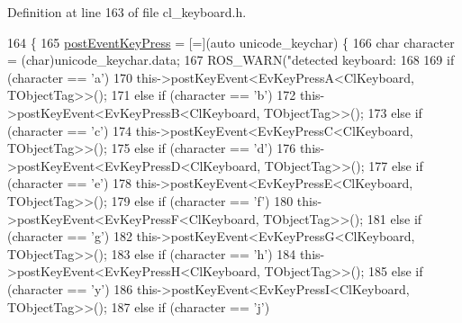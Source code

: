 Definition at line 163 of file cl\+\_\+keyboard.\+h.


\begin{DoxyCode}
164         \{
165                 \hyperlink{classkeyboard__client_1_1ClKeyboard_aadd675eea47a012b348a4e6c00e7e9d0}{postEventKeyPress} = [=](\textcolor{keyword}{auto} unicode\_keychar) \{
166                         \textcolor{keywordtype}{char} character = (char)unicode\_keychar.data;
167                         ROS\_WARN(\textcolor{stringliteral}{"detected keyboard: %
168 
169                         \textcolor{keywordflow}{if} (character == \textcolor{charliteral}{'a'})
170                                 this->postKeyEvent<EvKeyPressA<ClKeyboard, TObjectTag>>();
171                         \textcolor{keywordflow}{else} \textcolor{keywordflow}{if} (character == \textcolor{charliteral}{'b'})
172                                 this->postKeyEvent<EvKeyPressB<ClKeyboard, TObjectTag>>();
173                         \textcolor{keywordflow}{else} \textcolor{keywordflow}{if} (character == \textcolor{charliteral}{'c'})
174                                 this->postKeyEvent<EvKeyPressC<ClKeyboard, TObjectTag>>();
175                         \textcolor{keywordflow}{else} \textcolor{keywordflow}{if} (character == \textcolor{charliteral}{'d'})
176                                 this->postKeyEvent<EvKeyPressD<ClKeyboard, TObjectTag>>();
177                         \textcolor{keywordflow}{else} \textcolor{keywordflow}{if} (character == \textcolor{charliteral}{'e'})
178                                 this->postKeyEvent<EvKeyPressE<ClKeyboard, TObjectTag>>();
179                         \textcolor{keywordflow}{else} \textcolor{keywordflow}{if} (character == \textcolor{charliteral}{'f'})
180                                 this->postKeyEvent<EvKeyPressF<ClKeyboard, TObjectTag>>();
181                         \textcolor{keywordflow}{else} \textcolor{keywordflow}{if} (character == \textcolor{charliteral}{'g'})
182                                 this->postKeyEvent<EvKeyPressG<ClKeyboard, TObjectTag>>();
183                         \textcolor{keywordflow}{else} \textcolor{keywordflow}{if} (character == \textcolor{charliteral}{'h'})
184                                 this->postKeyEvent<EvKeyPressH<ClKeyboard, TObjectTag>>();
185                         \textcolor{keywordflow}{else} \textcolor{keywordflow}{if} (character == \textcolor{charliteral}{'y'})
186                                 this->postKeyEvent<EvKeyPressI<ClKeyboard, TObjectTag>>();
187                         \textcolor{keywordflow}{else} \textcolor{keywordflow}{if} (character == \textcolor{charliteral}{'j'})
}
\end{DoxyCode}
